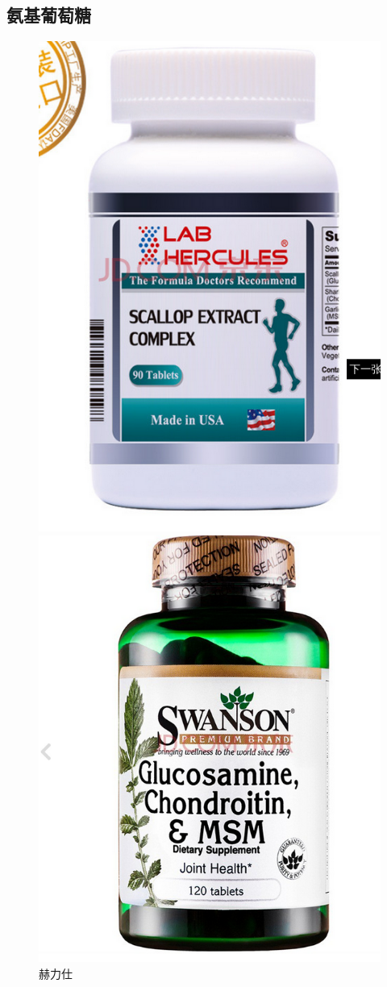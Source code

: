 \subsection{氨基葡萄糖}
\begin{figure}[htbp]
\begin{minipage}{.5\linewidth}
\centering\includegraphics[width=.8\linewidth]{figures/1.png}
\caption{赫力仕}\label{fig-hive-1}
\end{minipage}
\begin{minipage}{.5\linewidth}
\centering\includegraphics[width=.9\linewidth]{figures/2.png}

\end{minipage}
\end{figure}
